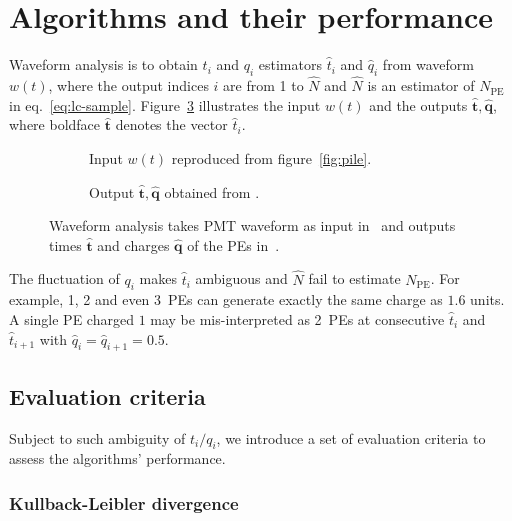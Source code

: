   \section{Algorithms and their performance}
\label{sec:algorithm}

Waveform analysis is to obtain $t_i$ and $q_i$ estimators $\hat{t}_i$ and $\hat{q}_i$ from waveform $w(t)$, where the output indices $i$ are from 1 to $\hat{N}$ and $\hat{N}$ is an estimator of $N_\mathrm{PE}$ in eq.~\eqref{eq:lc-sample}. Figure~\ref{fig:io} illustrates the input $w(t)$ and the outputs $\bm{\hat{t}}, \hat{\bm{q}}$, where boldface $\hat{\bm{t}}$ denotes the vector $\hat{t}_i$. 
\begin{figure}[H]
  \centering
  \begin{subfigure}{.45\textwidth}
    \resizebox{\textwidth}{!}{}
    \caption{\label{fig:input} Input $w(t)$ reproduced from figure~\ref{fig:pile}.}
  \end{subfigure}
  \begin{subfigure}{.45\textwidth}
    \resizebox{\textwidth}{!}{}
    \caption{\label{fig:output} Output $\hat{\bm{t}}, \hat{\bm{q}}$ obtained from .}
  \end{subfigure}
  \caption{\label{fig:io} Waveform analysis takes PMT waveform as input in~ and outputs times $\hat{\bm{t}}$ and charges $\hat{\bm{q}}$ of the PEs in~. }
\end{figure}

The fluctuation of $q_i$ makes $\hat{t}_i$ ambiguous and $\hat{N}$ fail to estimate $N_\mathrm{PE}$. For example, 1, 2 and even 3~PEs can generate exactly the same charge as $1.6$ units.  A single PE charged $1$ may be mis-interpreted as 2~PEs at consecutive $\hat{t}_i$ and $\hat{t}_{i+1}$ with $\hat{q}_i=\hat{q}_{i+1}=0.5$.

\subsection{Evaluation criteria}
\label{sec:criteria}
Subject to such ambiguity of $t_i/q_i$, we introduce a set of evaluation criteria to assess the algorithms' performance.

\subsubsection{Kullback-Leibler divergence}
\label{sec:pseudo}


